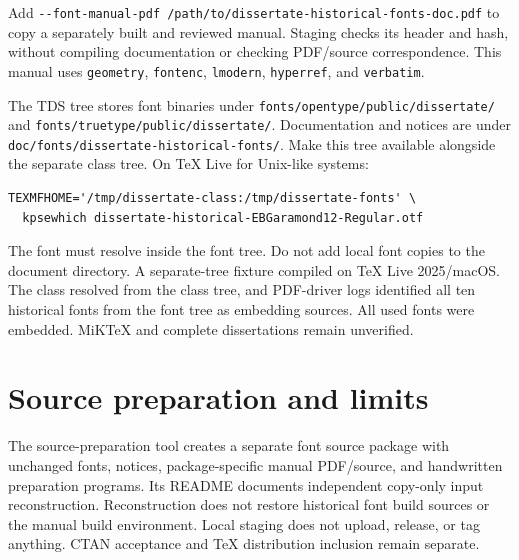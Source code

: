 \documentclass[10pt,letterpaper]{article}
\begin{document}
Add \verb|--font-manual-pdf /path/to/dissertate-historical-fonts-doc.pdf| to copy
a separately built and reviewed manual. Staging checks its header and hash,
without compiling documentation or checking PDF/source correspondence. This
manual uses \texttt{geometry}, \texttt{fontenc}, \texttt{lmodern},
\texttt{hyperref}, and \texttt{verbatim}.

The TDS tree stores font binaries under \texttt{fonts/opentype/public/dissertate/}
and \texttt{fonts/truetype/public/dissertate/}. Documentation and notices are under
\texttt{doc/fonts/dissertate-historical-fonts/}. Make this tree available alongside
the separate class tree. On TeX Live for Unix-like systems:
\begin{verbatim}
TEXMFHOME='/tmp/dissertate-class:/tmp/dissertate-fonts' \
  kpsewhich dissertate-historical-EBGaramond12-Regular.otf
\end{verbatim}
The font must resolve inside the font tree. Do not add local font copies to the
document directory. A separate-tree fixture compiled on TeX Live 2025/macOS. The class resolved from
the class tree, and PDF-driver logs identified all ten historical fonts from the
font tree as embedding sources. All used fonts were embedded. MiKTeX and complete
dissertations remain unverified.
\section*{Source preparation and limits}
The source-preparation tool creates a separate font source package with unchanged
fonts, notices, package-specific manual PDF/source, and handwritten preparation
programs. Its README documents independent copy-only input reconstruction.
Reconstruction does not restore historical font build sources or the manual build
environment. Local staging does not upload, release, or tag anything. CTAN
acceptance and TeX distribution inclusion remain separate.
\end{document}
